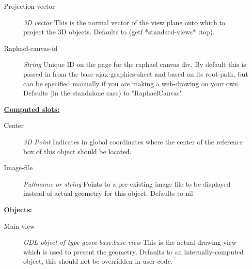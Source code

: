 \documentclass [11pt]{book}
\begin{document}
\begin{itemize}
\begin{description}
\item [Projection-vector]
\emph{3D vector} This is the normal vector of the view plane onto which to project the 3D objects. Defaults to (getf *standard-views* :top).


\item [Raphael-canvas-id]
\emph{String} Unique ID on the page for the raphael canvas div. By default this is passed in
from the base-ajax-graphics-sheet and based on its root-path, but can be specified manually
if you are making a web-drawing on your own. Defaults (in the standalone case) to "RaphaelCanvas"


\end{description}






\textbf{
\underline{Computed slots:}}

\begin{description}

\item [Center]
\emph{3D Point} Indicates in global coordinates where the center of the reference
box of this object should be located.


\item [Image-file]
\emph{Pathname or string} Points to a pre-existing image file to be displayed instead of actual geometry for this object. Defaults to nil


\end{description}






\textbf{
\underline{Objects:}}

\begin{description}

\item [Main-view]
\emph{GDL object of type geom-base:base-view} This is the actual drawing view which is used to present the geometry. Defaults to an
internally-computed object, this should not be overridden in user code.


\end{description}







\end{itemize}
\end{document}
